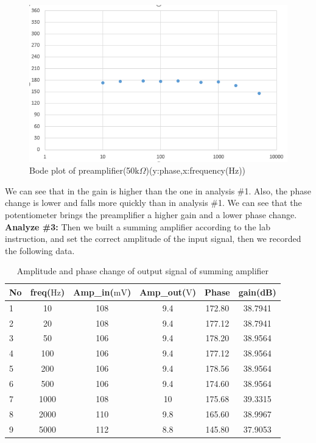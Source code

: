 \begin{figure}[!htbp]
	\centering 
	\begin{framed}
		\includegraphics[width=\linewidth]{images/1_4.PNG} 
		\caption{Bode plot of preamplifier(50$ \si{\kilo\Omega} $)(y:phase,x:frequency(Hz))}
		\label{fig:105} 
	\end{framed}
\end{figure}

\phantom{ } We can see that in the gain is higher than the one in analysis \#1. Also, the phase change is lower and falls more quickly than in analysis \#1. We can see that the potentiometer brings the preamplifier a higher gain and a lower phase change.\\

\textbf{Analyze \#3:} \newline
\phantom{ } Then we built a summing amplifier according to the lab instruction, and set the correct amplitude of the input signal, then we recorded the following data.

\begin{table}[!htbp]
	\centering
	\caption{Amplitude and phase change of output signal of summing amplifier}
	\begin{tabular}{lccccc}
		\toprule
		No &freq($\si{\hertz}$) &Amp\_in($\si{\milli\volt}$)&Amp\_out($\si{\volt}$)&Phase&gain(dB)\\
		\midrule
		1	&10		&108	&9.4	&172.80	&38.7941\\
		2	&20		&108	&9.4	&177.12	&38.7941\\
		3	&50		&106	&9.4	&178.20	&38.9564\\
		4	&100	&106	&9.4	&177.12	&38.9564\\
		5	&200	&106	&9.4	&178.56	&38.9564\\
		6	&500	&106	&9.4	&174.60	&38.9564\\
		7	&1000	&108	&10		&175.68	&39.3315\\
		8	&2000	&110	&9.8	&165.60	&38.9967\\
		9	&5000	&112	&8.8	&145.80	&37.9053\\
		\bottomrule
	\end{tabular}
	\label{tab:sumamp}
\end{table}

